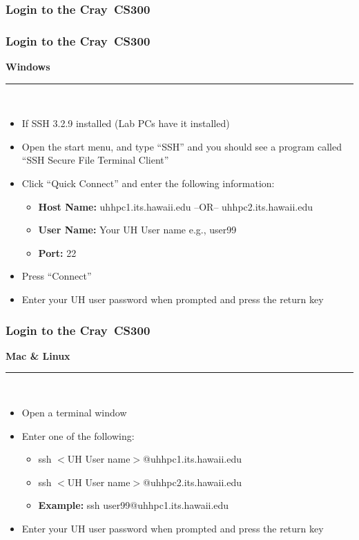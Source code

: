 \documentclass[t,hyperref={pdfpagelabels=false}]{beamer}
\newcommand{\craycs}{Cray~CS300}
\begin{document}
\subsubsection{Login to the {\craycs}}
\begin{frame}
\frametitle{Login to the {\craycs}}
	\begin{center}\textbf{Windows}\end{center}
	\hrule~\\
	\begin{itemize}
		\item If SSH 3.2.9 installed (Lab PCs have it installed)
		\item Open the start menu, and type ``SSH'' and you should see a program called ``SSH Secure File Terminal Client''
		\item Click ``Quick Connect'' and enter the following information:
			\begin{itemize}
			\item[] \textbf{Host Name:} uhhpc1.its.hawaii.edu --OR-- uhhpc2.its.hawaii.edu
			\item[] \textbf{User Name:} Your UH User name e.g., user99
			\item[] \textbf{Port:} 22
			\end{itemize}
		\item Press ``Connect''
		\item Enter your UH user password when prompted and press the return key
	\end{itemize}
\end{frame}


\begin{frame}
\frametitle{Login to the {\craycs}}
	\begin{center}\textbf{Mac \& Linux}\end{center}
	\hrule~\\
	\begin{itemize}
		\item Open a terminal window
		\item Enter one of the following:
		\begin{itemize}
			\item ssh $<$UH User name$>$@uhhpc1.its.hawaii.edu
			\item ssh $<$UH User name$>$@uhhpc2.its.hawaii.edu
			\item \textbf{Example:} ssh user99@uhhpc1.its.hawaii.edu
		\end{itemize}
		\item Enter your UH user password when prompted and press the return key
	\end{itemize}
\end{frame}
\end{document}
